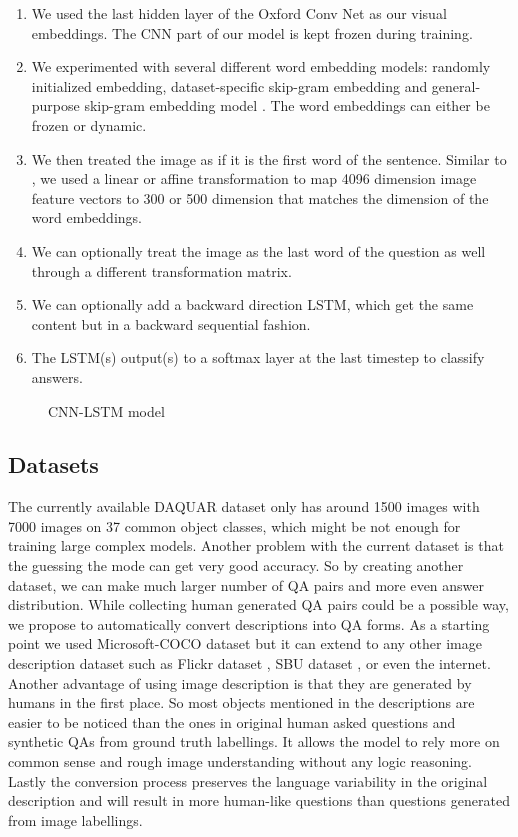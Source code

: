 \documentclass{article}
\renewcommand{\#}[1]{\textbf{#1}}
\begin{document}
\begin{enumerate}
    \item We used the last hidden layer of the Oxford Conv Net \cite{simonyan14} as our visual embeddings. The CNN part of our model is kept frozen during training.
    \item We experimented with several different word embedding models: randomly initialized embedding, dataset-specific skip-gram embedding and general-purpose skip-gram embedding model \cite{mikolov13}. The word embeddings can either be frozen or dynamic.
    \item We then treated the image as if it is the first word of the sentence. Similar to \cite{frome13}, we used a linear or affine transformation to map 4096 dimension image feature vectors to 300 or 500 dimension that matches the dimension of the word embeddings.
    \item We can optionally treat the image as the last word of the question as well through a different transformation matrix.
    \item We can optionally add a backward direction LSTM, which get the same content but in a backward sequential fashion.
    \item The LSTM(s) output(s) to a softmax layer at the last timestep to classify answers.
\end{enumerate}

\begin{figure}
\centering
\scalebox{0.7}{
}
\caption{CNN-LSTM model}
\label{fig:imgword}
\end{figure}

\subsection{Datasets}
The currently available DAQUAR dataset only has around 1500 images with 7000 images on 37 common object classes, which might be not enough for training large complex models. Another problem with the current dataset is that the guessing the mode can get very good accuracy. So by creating another dataset, we can make much larger number of QA pairs and more even answer distribution. While collecting human generated QA pairs could be a possible way, we propose to automatically convert descriptions into QA forms. As a starting point we used Microsoft-COCO dataset \cite{mscoco} but it can extend to any other image description dataset such as Flickr dataset \cite{flickr8k}, SBU dataset \cite{ordonez11}, or even the internet. Another advantage of using image description is that they are generated by humans in the first place. So most objects mentioned in the descriptions are easier to be noticed than the ones in original human asked questions and synthetic QAs from ground truth labellings. It allows the model to rely more on common sense and rough image understanding without any logic reasoning. Lastly the conversion process preserves the language variability in the original description and will result in more human-like questions than questions generated from image labellings.
\end{document}
